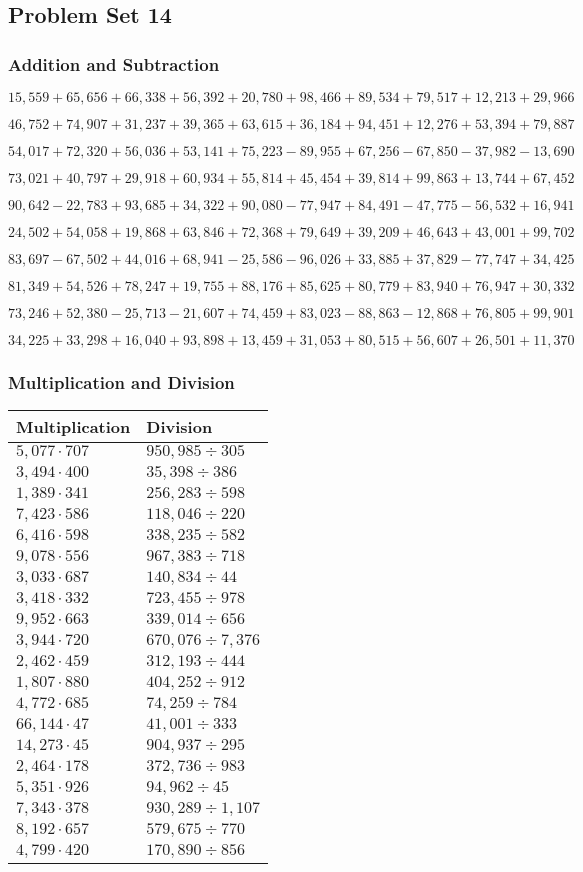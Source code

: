 \hypertarget{problem-set-14-4}{%
\subsection{Problem Set 14}\label{problem-set-14-4}}

\hypertarget{addition-and-subtraction-236}{%
\subsubsection{Addition and
Subtraction}\label{addition-and-subtraction-236}}

\(15,559+65,656+66,338+56,392+20,780+98,466+89,534+79,517+12,213+ 29,966\)

\(46,752+74,907+31,237+39,365+63,615+36,184+94,451+12,276+53,394+79,887\)

\(54,017+72,320+56,036+53,141+75,223-89,955+67,256-67,850-37,982-13,690\)

\(73,021+40,797+29,918+60,934+55,814+45,454+39,814+99,863+13,744+67,452\)

\(90,642-22,783+93,685+34,322+90,080-77,947+84,491-47,775-56,532+16,941\)

\(24,502+54,058+19,868+63,846+72,368+79,649+39,209+46,643+43,001+99,702\)

\(83,697-67,502+44,016+68,941-25,586-96,026+33,885+37,829-77,747+34,425\)

\(81,349+54,526+78,247+19,755+88,176+85,625+80,779+83,940+76,947+30,332\)

\(73,246+52,380-25,713-21,607+74,459+83,023-88,863-12,868+76,805+99,901\)

\(34,225+33,298+16,040+93,898+13,459+31,053+80,515+56,607+26,501+11,370\)

\hypertarget{multiplication-and-division-235}{%
\subsubsection{Multiplication and
Division}\label{multiplication-and-division-235}}

\begin{longtable}[]{@{}ll@{}}
\toprule
Multiplication & Division\tabularnewline
\midrule
\endhead
\(5,077\cdot707\) & \(950,985÷305\)\tabularnewline
\(3,494\cdot400\) & \(35,398÷386\)\tabularnewline
\(1,389\cdot341\) & \(256,283÷598\)\tabularnewline
\(7,423\cdot586\) & \(118,046÷220\)\tabularnewline
\(6,416\cdot598\) & \(338,235÷582\)\tabularnewline
\(9,078\cdot556\) & \(967,383÷718\)\tabularnewline
\(3,033\cdot687\) & \(140,834÷44\)\tabularnewline
\(3,418\cdot332\) & \(723,455÷978\)\tabularnewline
\(9,952\cdot663\) & \(339,014÷656\)\tabularnewline
\(3,944\cdot720\) & \(670,076÷7,376\)\tabularnewline
\(2,462\cdot459\) & \(312,193÷444\)\tabularnewline
\(1,807\cdot880\) & \(404,252÷912\)\tabularnewline
\(4,772\cdot685\) & \(74,259÷784\)\tabularnewline
\(66,144\cdot47\) & \(41,001÷333\)\tabularnewline
\(14,273\cdot45\) & \(904,937÷295\)\tabularnewline
\(2,464\cdot178\) & \(372,736÷983\)\tabularnewline
\(5,351\cdot926\) & \(94,962÷45\)\tabularnewline
\(7,343\cdot378\) & \(930,289÷1,107\)\tabularnewline
\(8,192\cdot657\) & \(579,675÷770\)\tabularnewline
\(4,799\cdot420\) & \(170,890÷856\)\tabularnewline
\bottomrule
\end{longtable}

